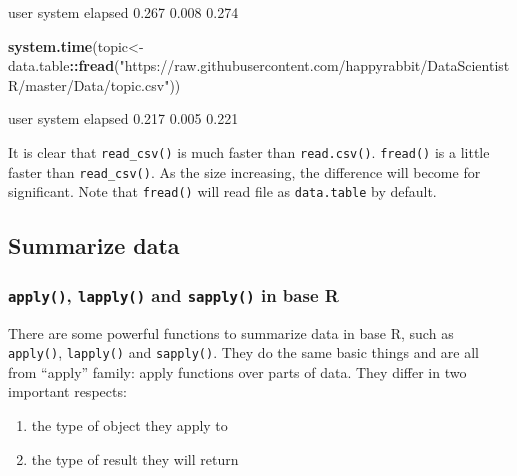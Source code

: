 \documentclass[
]{article}
\newenvironment{Shaded}{\begin{snugshade}}{\end{snugshade}}
\newcommand{\KeywordTok}[1]{\textcolor[rgb]{0.13,0.29,0.53}{\textbf{#1}}}
\newcommand{\NormalTok}[1]{#1}
\newcommand{\OperatorTok}[1]{\textcolor[rgb]{0.81,0.36,0.00}{\textbf{#1}}}
\newcommand{\StringTok}[1]{\textcolor[rgb]{0.31,0.60,0.02}{#1}}
\providecommand{\tightlist}{%
  \setlength{\itemsep}{0pt}\setlength{\parskip}{0pt}}
\begin{document}
\begin{Shaded}
\begin{Highlighting}[]
\NormalTok{   user  system elapsed }
\NormalTok{  0.267   0.008   0.274 }
\end{Highlighting}
\end{Shaded}

\begin{Shaded}
\begin{Highlighting}[]
\KeywordTok{system.time}\NormalTok{(topic<-data.table}\OperatorTok{::}\KeywordTok{fread}\NormalTok{(}\StringTok{"https://raw.githubusercontent.com/happyrabbit/DataScientistR/master/Data/topic.csv"}\NormalTok{))}
\end{Highlighting}
\end{Shaded}

\begin{Shaded}
\begin{Highlighting}[]
\NormalTok{   user  system elapsed }
\NormalTok{  0.217   0.005   0.221 }
\end{Highlighting}
\end{Shaded}

It is clear that \texttt{read\_csv()} is much faster than
\texttt{read.csv()}. \texttt{fread()} is a little faster than
\texttt{read\_csv()}. As the size increasing, the difference will become
for significant. Note that \texttt{fread()} will read file as
\texttt{data.table} by default.

\hypertarget{summarize-data}{%
\subsection{Summarize data}\label{summarize-data}}

\hypertarget{apply-lapply-and-sapply-in-base-r}{%
\subsubsection{\texorpdfstring{\texttt{apply()}, \texttt{lapply()} and
\texttt{sapply()} in base
R}{apply(), lapply() and sapply() in base R}}\label{apply-lapply-and-sapply-in-base-r}}

There are some powerful functions to summarize data in base R, such as
\texttt{apply()}, \texttt{lapply()} and \texttt{sapply()}. They do the
same basic things and are all from ``apply'' family: apply functions
over parts of data. They differ in two important respects:

\begin{enumerate}
\def\labelenumi{\arabic{enumi}.}
\tightlist
\item
  the type of object they apply to
\item
  the type of result they will return
\end{enumerate}
\end{document}
